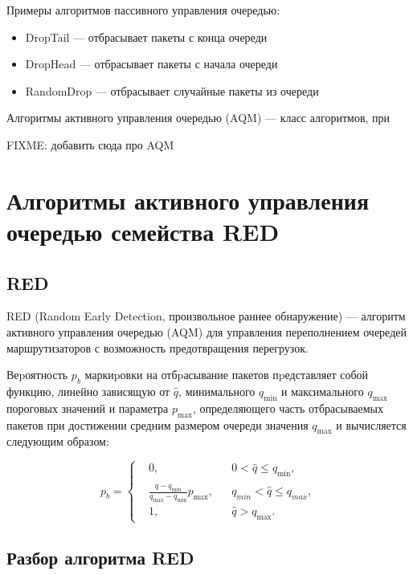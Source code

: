Примеры алгоритмов пассивного управления очередью:

\begin{itemize}
  \item DropTail --- отбрасывает пакеты с конца очереди
  \item DropHead --- отбрасывает пакеты с начала очереди 
  \item RandomDrop --- отбрасывает случайные пакеты из очереди 
\end{itemize}


Алгоритмы активного управления очередью (AQM) --- класс алгоритмов, при

FIXME: добавить сюда про AQM








\section{Алгоритмы активного управления очередью семейства RED}
\label{chap1:sec3}

\subsection{RED}
\label{chap1:sec3:sub1}

RED \cite{red-1993} (Random Early Detection, произвольное раннее
обнаружение) --- алгоритм активного управления очередью (AQM) для
управления переполнением очередей маршрутизаторов с возможность
предотвращения перегрузок.

Веpоятность $p_{b}$ маркиpовки на отбpасывание пакетов пpедставляет
собой функцию, линейно зависящую от $\hat{q}$, минимального $q_{\min}$
и максимального $q_{\max}$ пороговых значений и параметра $p_{\max}$,
определяющего часть отбрасываемых пакетов при достижении средним
размером очереди значения $q_{\max}$ и вычисляется следующим образом:

\[
p_{b} = \left\{
  \begin{aligned}
& 0, &&    0 < \hat{q} \leqslant q_{\min}, \\
& \frac{\hat{q} - q_{\min}}{q_{\max} - q_{\min}} p_{\max}, &&  q_{min} < \hat{q} \leqslant q_{max} ,\\
& 1, &&   \hat{q} > q_{\max}. 
  \end{aligned}
\right.
\]

\subsection{Разбор алгоритма RED}
\label{chap1:sec3:sub2}

